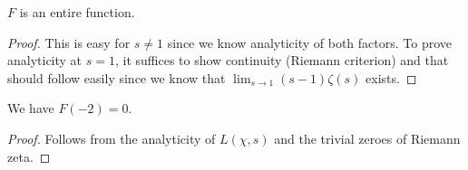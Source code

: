  \begin{lemma}
  $F$ is an entire function.
 \end{lemma}

 \begin{proof}
  This is easy for $s \ne 1$ since we know analyticity of both factors. To prove analyticity at $s = 1$, it suffices to show continuity (Riemann criterion) and that should follow easily since we know that $\lim_{s \to 1} (s - 1) \zeta(s)$ exists.
 \end{proof}

 \begin{lemma}
  We have $F(-2) = 0$.
 \end{lemma}

 \begin{proof}
  Follows from the analyticity of $L(\chi, s)$ and the trivial zeroes of Riemann zeta.
 \end{proof}
